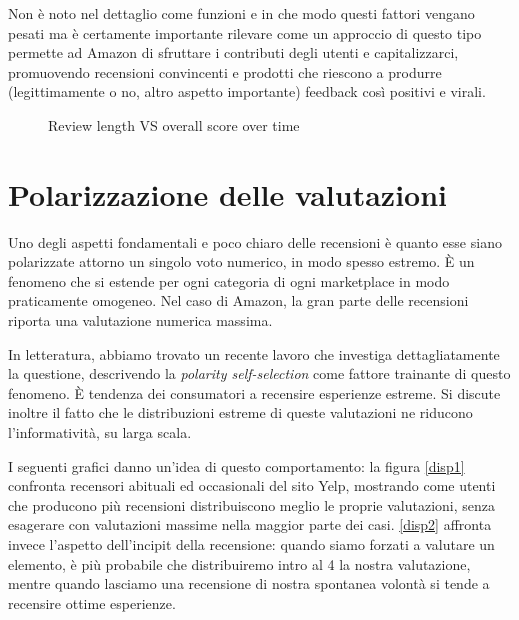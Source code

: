 \par 
Non è noto nel dettaglio come funzioni e in che modo questi fattori vengano pesati ma è certamente importante rilevare come un approccio di questo tipo permette ad Amazon di sfruttare i contributi degli utenti e capitalizzarci, promuovendo recensioni convincenti e prodotti che riescono a produrre (legittimamente o no, altro aspetto importante) feedback così positivi e virali.


\begin{figure}[H]

  \centering
  
  \caption{Review length VS overall score over time}
  \label{figtime3}
\end{figure}

\newpage
\section{Polarizzazione delle valutazioni}

Uno degli aspetti fondamentali e poco chiaro delle recensioni è quanto esse siano polarizzate attorno un singolo voto numerico, in modo spesso estremo. È un fenomeno che si estende per ogni categoria di ogni marketplace in modo praticamente omogeneo.
Nel caso di Amazon, la gran parte delle recensioni riporta una valutazione numerica massima.
\par
In letteratura, abbiamo trovato un recente lavoro \cite{schoenmuller2018extreme} che investiga dettagliatamente la questione, descrivendo la \textit{polarity self-selection} come fattore trainante di questo fenomeno. È tendenza dei consumatori a recensire esperienze estreme. Si discute inoltre il fatto che le distribuzioni estreme di queste valutazioni ne riducono l'informatività, su larga scala.

\par
I seguenti grafici danno un'idea di questo comportamento: la figura \ref{disp1} confronta recensori abituali ed occasionali del sito Yelp, mostrando come utenti che producono più recensioni distribuiscono meglio le proprie valutazioni, senza esagerare con valutazioni massime nella maggior parte dei casi. \ref{disp2} affronta invece l'aspetto dell'incipit della recensione: quando siamo forzati a valutare un elemento, è più probabile che distribuiremo intro al 4 la nostra valutazione, mentre quando lasciamo una recensione di nostra spontanea volontà si tende a recensire ottime esperienze.

